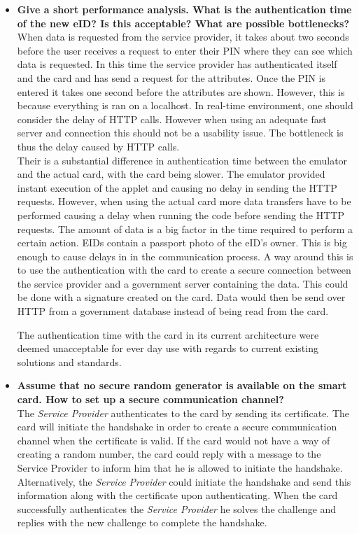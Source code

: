 \documentclass[12pt]{report}
\begin{document}
\begin{itemize}
\item \textbf{Give a short performance analysis. What is the authentication time of the new eID? Is this acceptable? What are possible bottlenecks?}\\
When data is requested from the service provider, it takes about two seconds before the user receives a request to enter their PIN where they can see which data is requested. In this time the service provider has authenticated itself and the card and has send a request for the attributes. Once the PIN is entered it takes one second before the attributes are shown. However, this is because everything is ran on a localhost. In real-time environment, one should consider the delay of HTTP calls. However when using an adequate fast server and connection this should not be a usability issue. The bottleneck is thus the delay caused by HTTP calls.\\

Their is a substantial difference in authentication time between the emulator and the actual card, with the card being slower. The emulator provided instant execution of the applet and causing no delay in sending the HTTP requests. However, when using the actual card more data transfers have to be performed causing a delay when running the code before sending the HTTP requests. The amount of data is a big factor in the time required to perform a certain action. EIDs contain a passport photo of the eID's owner. This is big enough to cause delays in in the communication process. A way around this is to use the authentication with the card to create a secure connection between the service provider and a government server containing the data. This could be done with a signature created on the card. Data would then be send over HTTP from a government database instead of being read from the card.

The authentication time with the card in its current architecture were deemed unacceptable for ever day use with regards to current existing solutions and standards.

\item \textbf{Assume that no secure random generator is available on the smart card. How to set up a secure communication channel?}\\
The \textit{Service Provider} authenticates to the card by sending its certificate. The card will initiate the handshake in order to create a secure communication channel when the certificate is valid. If the card would not have a  way of creating a random number, the card could reply with a message to the Service Provider to inform him that he is allowed to initiate the handshake. Alternatively, the \textit{Service Provider} could initiate the handshake and send this information along with the certificate upon authenticating. When the card successfully authenticates the \textit{Service Provider} he solves the challenge and replies with the new challenge to complete the handshake.%


\end{itemize}
\end{document}
